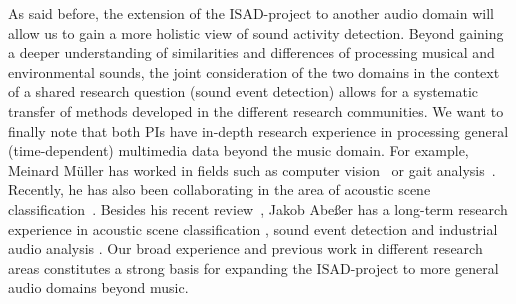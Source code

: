 \documentclass[11pt,a4paper]{article}
\def\PN{\mathrm{ISAD}}
\theoremstyle{plain} \newtheorem{define}{Definition}[section]
\begin{document}
{As said before, the extension of the $\PN$-project to another audio domain will allow us to gain a more holistic view of sound activity detection. Beyond gaining a deeper understanding of similarities and differences of processing musical and environmental sounds, the joint consideration of the two domains in the context of a shared research question (sound event detection) allows for a systematic transfer of methods developed in the different research communities.
%
We want to finally note that both PIs have in-depth research experience in processing general (time-dependent) multimedia data beyond the music domain.
%
For example, Meinard M\"uller has worked in fields such as computer vision~\cite{BaakMBST11_DepthCamera_ICCV} or gait analysis~\cite{GhassemiHMGMKE18_GaitSeg_Sensors}. Recently, he has also been collaborating in the area of acoustic scene classification~\cite{MezzaHMS20_ProjectDomainAdaptation_MLSP,MezzaHMS20_DomainAdaptation_EUSIPCO}.
%
Besides his recent review~\cite{Abesser20_AcousticSceneClassification_AppliedSciences}, Jakob Abe{\ss}er has a long-term research experience in acoustic scene classification \cite{Abesser:2017:DCASE}, sound event detection \cite{Abesser:2021:USM-SED:ARXIV,Abesser:2018:IEEE_FICLOUD} and industrial audio analysis \cite{Grollmisch:2019:EUSIPCO}.
%
Our broad experience and previous work in different research areas constitutes a strong basis for expanding the $\PN$-project to more general audio domains beyond music.


}
\end{document}
